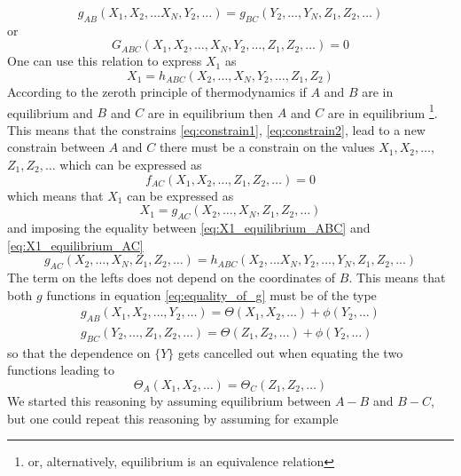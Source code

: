 \begin{equation}
    g_{AB} (X_1, X_2, \dots X_N, Y_2, \dots) = g_{BC} (Y_2, \dots, Y_N, Z_1, Z_2, \dots)
    \label{eq:equality_of_g}
\end{equation}
or
\begin{equation*}
    G_{ABC} (X_1, X_2, \dots, X_N, Y_2, \dots, Z_1, Z_2, \dots) = 0
\end{equation*}
One can use this relation to express $X_1$ as 
\begin{equation}
    X_1 = h_{ABC}(X_2, \dots, X_N, Y_2, \dots, Z_1, Z_2)
    \label{eq:X1_equilibrium_ABC}
\end{equation}
According to the zeroth principle of thermodynamics if $A$ and $B$ are in equilibrium and $B$ and $C$ are in equilibrium then $A$ and $C$ are in equilibrium 
\footnote{or, alternatively, equilibrium is an equivalence relation}. This means that the constrains \ref{eq:constrain1}, \ref{eq:constrain2}, lead to a new constrain between $A$ and $C$
there must be a constrain on the values ${X_1, X_2, \dots}$, ${Z_1, Z_2, \dots}$ which can be expressed as 
\begin{equation*}
    f_{AC} (X_1, X_2, \dots, Z_1, Z_2, \dots) = 0
\end{equation*}
which means that $X_1$ can be expressed as
\begin{equation}
    X_1 = g_{AC} (X_2, \dots, X_N, Z_1, Z_2, \dots)
    \label{eq:X1_equilibrium_AC}
\end{equation}
and imposing the equality between \ref{eq:X1_equilibrium_ABC} and \ref{eq:X1_equilibrium_AC}
\begin{equation*}
    g_{AC} (X_2, \dots, X_N, Z_1, Z_2, \dots) = h_{ABC}(X_2, \dots X_N, Y_2, \dots, Y_N, Z_1, Z_2, ...)
\end{equation*}
The term on the lefts does not depend on the coordinates of $B$. This means that both $g$ functions in equation \ref{eq:equality_of_g} must be of the type
\begin{gather*}
    g_{AB}(X_1, X_2, \dots, Y_2, \dots) = \Theta(X_1, X_2, \dots) + \phi(Y_2, \dots) \\
    g_{BC}(Y_2, \dots, Z_1, Z_2, \dots) = \Theta(Z_1, Z_2, \dots) + \phi(Y_2, \dots)
\end{gather*}
so that the dependence on $\{Y\}$ gets cancelled out when equating the two functions leading to 
\begin{equation*}
    \Theta_A(X_1, X_2, \dots) = \Theta_C(Z_1, Z_2, \dots)
\end{equation*}
We started this reasoning by assuming equilibrium between $A-B$ and $B-C$, but one could repeat this reasoning by assuming for example
